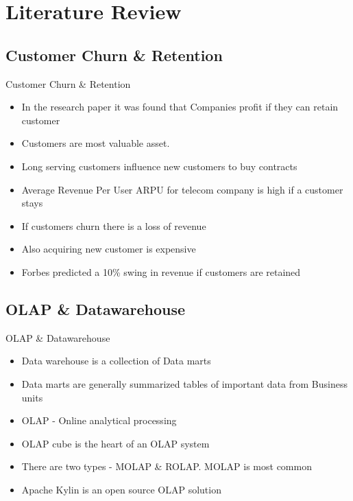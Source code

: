 \documentclass{beamer}
\begin{document}
\section{Literature Review}
%

\subsection{Customer Churn \& Retention}
\begin{frame}{Customer Churn \& Retention}
	\begin{itemize}
		\item In the research paper it was found that Companies profit if they can retain customer
		\item Customers are most valuable asset.
		\item Long serving customers influence new customers to buy contracts
		\item Average Revenue Per User ARPU for telecom company is high if a customer stays
		\item If customers churn there is a loss of revenue
		\item Also acquiring new customer is expensive
		\item Forbes predicted a 10\% swing in revenue if customers are retained
	\end{itemize}
\end{frame}
\subsection{OLAP \& Datawarehouse}
\begin{frame}{OLAP \& Datawarehouse}
	\begin{itemize}
		\item Data warehouse is a collection of Data marts
		\item Data marts are generally summarized tables of important data from Business units
		\item OLAP  - Online analytical processing
		\item OLAP cube is the heart of an OLAP system
		\item There are two types - MOLAP \& ROLAP. MOLAP is most common
		\item Apache Kylin is an open source OLAP solution
	\end{itemize}
\end{frame}
\end{document}
